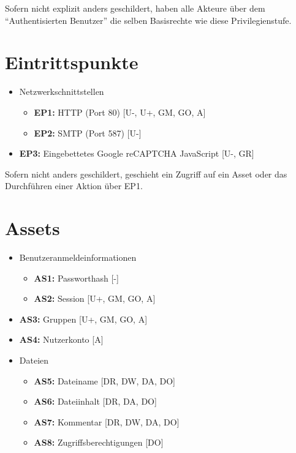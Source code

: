 \documentclass[fontsize=12pt,DIV=14,BCOR=10mm,a4paper,parskip=half-,headsepline,headinclude,english,ngerman,bibliography=totocnumbered]{scrreprt}
\begin{document}
Sofern nicht explizit anders geschildert, haben alle Akteure über dem \enquote{Authentisierten Benutzer} die selben Basisrechte wie diese Privilegienstufe.

\chapter{Eintrittspunkte}

\begin{itemize}
  \item Netzwerkschnittstellen
  \begin{itemize}
    \item \textbf{EP1:} HTTP (Port 80)  [U-, U+, GM, GO, A]
    \item \textbf{EP2:} SMTP (Port 587) [U-]
  \end{itemize}
  \item \textbf{EP3:} Eingebettetes Google reCAPTCHA JavaScript [U-, GR]
\end{itemize}

Sofern nicht anders geschildert, geschieht ein Zugriff auf ein Asset oder das Durchführen einer Aktion über EP1.

\chapter{Assets}

\begin{itemize}
  \item Benutzeranmeldeinformationen
  \begin{itemize}
    \item \textbf{AS1:} Passworthash [-]
    \item \textbf{AS2:} Session [U+, GM, GO, A]
  \end{itemize}
  \item \textbf{AS3:} Gruppen [U+, GM, GO, A]
  \item \textbf{AS4:} Nutzerkonto [A]
  \item Dateien
  \begin{itemize}
    \item \textbf{AS5:} Dateiname [DR, DW, DA, DO]
    \item \textbf{AS6:} Dateiinhalt [DR, DA, DO]
    \item \textbf{AS7:} Kommentar [DR, DW, DA, DO]
    \item \textbf{AS8:} Zugriffsberechtigungen [DO]
  \end{itemize}
\end{itemize}
\end{document}
